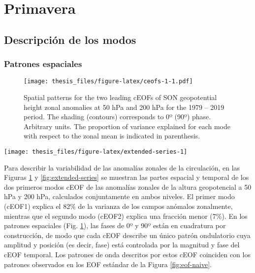 \documentclass[12pt,oneside]{reedthesis}
\begin{document}
\hypertarget{primavera}{%
\section{Primavera}\label{primavera}}

\hypertarget{descripciuxf3n-de-los-modos}{%
\subsection{Descripción de los modos}\label{descripciuxf3n-de-los-modos}}

\hypertarget{espaciales}{%
\subsubsection{Patrones espaciales}\label{espaciales}}


\begin{figure}
\centering
\texttt{[image: thesis\_files/figure-latex/ceofs-1-1.pdf]}
\caption{\label{fig:ceofs-1}Spatial patterns for the two leading cEOFs of SON geopotential height zonal anomalies at 50 hPa and 200 hPa for the 1979 -- 2019 period. The shading (contours) corresponds to 0º (90º) phase. Arbitrary units. The proportion of variance explained for each mode with respect to the zonal mean is indicated in parenthesis.}
\end{figure}

\begin{figure*}
\texttt{[image: thesis\_files/figure-latex/extended-series-1]} \caption{Time series of the two leading cEOFs of SON geopotential height zonal anomalies at 50 hPa and 200 hPa. cEOF1 (row a) and cEOF2 (row b) separated in their 0º (column 1) and 90º (column 2) phase. Dark straight line is the linear trend. Black horizontal and vertical line mark the mean value and range of each time series, respectively.}\label{fig:extended-series}
\end{figure*}
Para describir la variabilidad de las anomalías zonales de la circulación, en las Figuras \ref{fig:ceofs-1} y \ref{fig:extended-series} se muestran las partes espacial y temporal de los dos primeros modos cEOF de las anomalías zonales de la altura geopotencial a 50 hPa y 200 hPa, calculados conjuntamente en ambos niveles.
El primer modo (cEOF1) explica el 82\% de la varianza de los campos anómalos zonalmente, mientras que el segundo modo (cEOF2) explica una fracción menor (7\%).
En los patrones espaciales (Fig. \ref{fig:ceofs-1}), las fases de 0º y 90º están en cuadratura por construcción, de modo que cada cEOF describe un único patrón ondulatorio cuya amplitud y posición (es decir, fase) está controlada por la magnitud y fase del cEOF temporal.
Los patrones de onda descritos por estos cEOF coinciden con los patrones observados en los EOF estándar de la Figura \ref{fig:eof-naive}.
\end{document}
